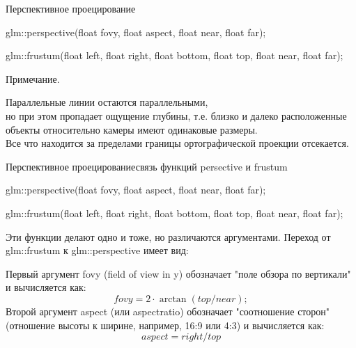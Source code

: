 \documentclass{beamer}
\begin{document}
	\begin{frame}{Перспективное проецирование}

		glm::perspective(float fovy, float aspect, float near, float far);
		
		glm::frustum(float left, float right, float bottom, float top, float near, float far);

		Примечание.

		Параллельные линии остаются параллельными,
		\\ но при этом пропадает ощущение глубины, т.е. близко и далеко расположенные объекты относительно камеры имеют одинаковые размеры.
		\\ Все что находится за пределами границы ортографической проекции отсекается.
	\end{frame}

	\begin{frame}{Перспективное проецирование}{связь функций persective и frustum}

		
		glm::perspective(float fovy, float aspect, float near, float far);
		
		glm::frustum(float left, float right, float bottom, float top, float near, float far);
		
		Эти функции делают одно и тоже, но различаются аргументами.
		Переход от glm::frustum к glm::perspective имеет вид:

		Первый аргумент fovy  (field of view in y) обозначает "поле обзора по вертикали" и вычисляется как:
		\[
			fovy = 2 \cdot \arctan (top / near);
		\]
		Второй аргумент aspect (или aspectratio) обозначает "соотношение сторон" (отношение высоты к ширине, например, 16:9 или 4:3) и вычисляется как:
		\[
			aspect =  right / top
		\]
		

	\end{frame}
\end{document}
